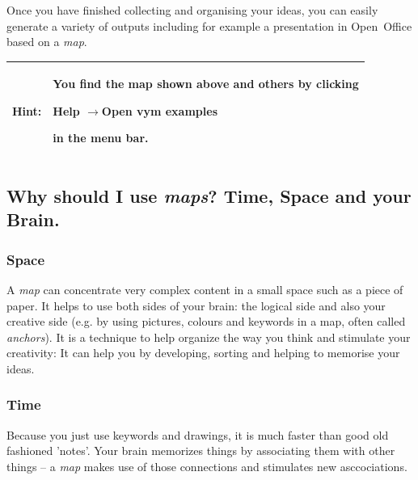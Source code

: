 \documentclass[12pt,a4paper]{article}
\newcommand{\hint}[1]{
    \begin{center} 
        \begin{tabular}{|rp{12cm}|} \hline
            {\bf Hint}:& #1\\   \hline
        \end{tabular}
            \marginpar{\Huge !} 
    \end{center} 
}
\newcommand{\ra}{$\longrightarrow$}
\begin{document}
Once you have finished collecting and organising your ideas, you can
easily generate a variety of outputs including for example a
presentation in Open~Office based on a {\em map}.

\hint{You find the map shown above and others by clicking \begin{center}Help \ra Open vym
examples\end{center} in the menu bar.}

\subsection{Why should I use {\em maps}? Time, Space and your Brain.}
\subsubsection*{Space}
A {\em map} can concentrate very complex content in a small space such as a
piece of paper. It helps to use both sides of your brain: the logical
side and also your creative side (e.g. by using pictures, colours and
keywords in a map, often called {\em anchors}).  It is a technique to help
organize the way you think and stimulate your creativity: It can help you by developing, sorting and helping to memorise your ideas. 

\subsubsection*{Time}
Because you just use keywords and drawings, it is much faster than good
old fashioned 'notes'. Your brain memorizes things by associating them with
other things -- a {\em map} makes use of those connections and stimulates
new asccociations. 
\end{document}
